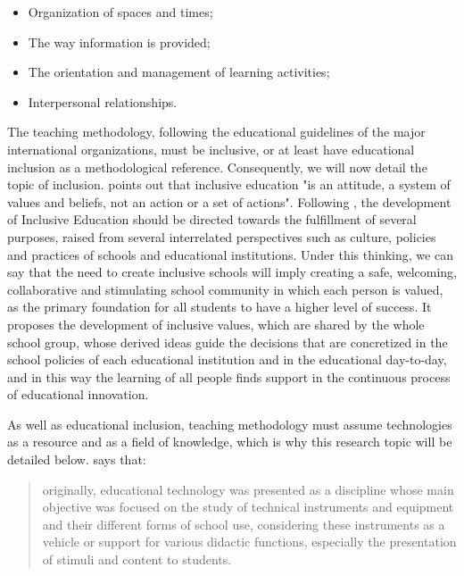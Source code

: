 \documentclass[english]{textolivre}
\begin{document}
\begin{itemize}
    \item Organization of spaces and times;
    \item The way information is provided;
    \item The orientation and management of learning activities;
    \item Interpersonal relationships.
\end{itemize}

The teaching methodology, following the educational guidelines of the major international organizations, must be inclusive, or at least have educational inclusion as a methodological reference. Consequently, we will now detail the topic of inclusion. \textcite[p. 27]{arnaiz_reto_1996} points out that inclusive education "is an attitude, a system of values and beliefs, not an action or a set of actions". Following \textcite{booth_index_2000}, the development of Inclusive Education should be directed towards the fulfillment of several purposes, raised from several interrelated perspectives such as culture, policies and practices of schools and educational institutions. Under this thinking, we can say that the need to create inclusive schools will imply creating a safe, welcoming, collaborative and stimulating school community in which each person is valued, as the primary foundation for all students to have a higher level of success. It proposes the development of inclusive values, which are shared by the whole school group, whose derived ideas guide the decisions that are concretized in the school policies of each educational institution and in the educational day-to-day, and in this way the learning of all people finds support in the continuous process of educational innovation.

As well as educational inclusion, teaching methodology must assume technologies as a resource and as a field of knowledge, which is why this research topic will be detailed below. \textcite[p. 1]{de_la_orden_hoz_tecnologieducativa_1986} says that:
\begin{quote}
    originally, educational technology was presented as a discipline whose main objective was focused on the study of technical instruments and equipment and their different forms of school use, considering these instruments as a vehicle or support for various didactic functions, especially the presentation of stimuli and content to students.
\end{quote}
\end{document}
